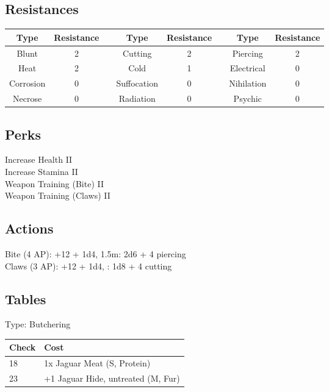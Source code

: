 \subsection{Resistances}
\begin{minipage}[H]{1\textwidth}
    \centering
    \begin{tabular}[c]{|c | c | c | c | c | c | c | c|}
        \hline
        Type & Resistance && Type & Resistance && Type & Resistance\\
        \hline
        Blunt & 2 &&
        Cutting & 2 &&
        Piercing & 2\\
        Heat & 2 &&
        Cold & 1 &&
        Electrical & 0\\
        Corrosion & 0 &&
        Suffocation & 0 &&
        Nihilation & 0 \\
        Necrose & 0 &&
        Radiation & 0 &&
        Psychic & 0\\
        \hline
    \end{tabular}
\end{minipage}

\subsection{Perks}
Increase Health II\\
Increase Stamina II\\
Weapon Training (Bite) II\\
Weapon Training (Claws) II\\

\subsection{Actions}
Bite (4 AP): +12 + 1d4, 1.5m: 2d6 + 4 piercing\\

Claws (3 AP): +12 + 1d4, : 1d8 + 4 cutting\\

\subsection{Tables}
Type: Butchering
\\
\begin{minipage}{0.8\textwidth}
    \begin{tabular}{|l | l|}
        \hline
        Check & Cost\\
        \hline
        18 & 1x Jaguar Meat (S, Protein)\\
        23 & +1 Jaguar Hide, untreated (M, Fur)\\
        \hline
    \end{tabular}
\end{minipage}
\pagebreak